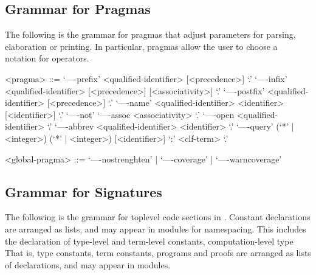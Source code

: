 \subsection{Grammar for Pragmas}\label{section:syntax-pragmas}

The following is the grammar for pragmas that adjust parameters for parsing, elaboration or printing.
In particular, pragmas allow the user to choose a notation for operators.

\begin{grammar}
<pragma> ::= `----prefix' <qualified-identifier> [<precedence>] `.'
\alt `----infix' <qualified-identifier> [<precedence>] [<associativity>] `.'
\alt `----postfix' <qualified-identifier> [<precedence>] `.'
\alt `----name' <qualified-identifier> <identifier> [<identifier>] `.'
\alt `----not'
\alt `----assoc <associativity> `.'
\alt `----open <qualified-identifier> `.'
\alt `----abbrev <qualified-identifier> <identifier> `.'
\alt `----query' (`*' | <integer>) (`*' | <integer>) [<identifier>] `:' <clf-term> `.'

<global-pragma> ::= `----nostrenghten' | `----coverage' | `----warncoverage'
\end{grammar}

\subsection{Grammar for \Beluga Signatures}\label{section:syntax-signature}

The following is the grammar for toplevel code sections in \Beluga.
Constant declarations are arranged as lists, and may appear in modules for namespacing.
This includes the declaration of \LF type-level and term-level constants, computation-level type
That is, type constants, term constants, programs and proofs are arranged as lists of declarations, and may appear in modules.

